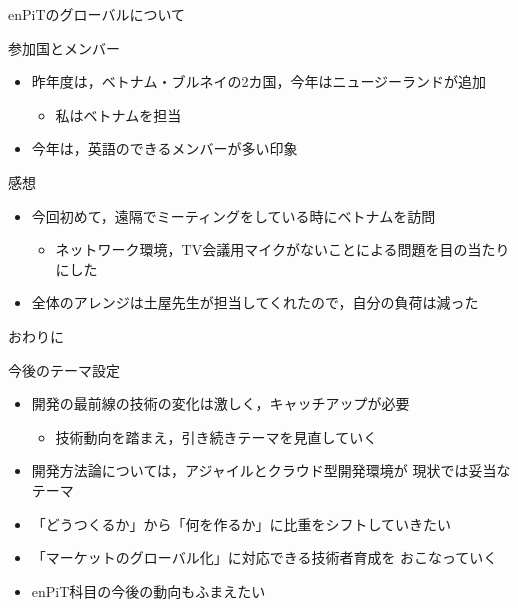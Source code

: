 \documentclass[t]{beamer}
\begin{document}
\begin{frame}[label=sec-9]{enPiTのグローバルについて}
\begin{block}{参加国とメンバー}
\begin{itemize}
\item 昨年度は，ベトナム・ブルネイの2カ国，今年はニュージーランドが追加
\begin{itemize}
\item 私はベトナムを担当
\end{itemize}
\item 今年は，英語のできるメンバーが多い印象
\end{itemize}
\end{block}

\begin{block}{感想}
\begin{itemize}
\item 今回初めて，遠隔でミーティングをしている時にベトナムを訪問
\begin{itemize}
\item ネットワーク環境，TV会議用マイクがないことによる問題を目の当たりにした
\end{itemize}
\item 全体のアレンジは土屋先生が担当してくれたので，自分の負荷は減った
\end{itemize}
\end{block}
\end{frame}
\begin{frame}[label=sec-10]{おわりに}
\begin{block}{今後のテーマ設定}
\begin{itemize}
\item 開発の最前線の技術の変化は激しく，キャッチアップが必要
\begin{itemize}
\item 技術動向を踏まえ，引き続きテーマを見直していく
\end{itemize}
\item 開発方法論については，アジャイルとクラウド型開発環境が
現状では妥当なテーマ
\item 「どうつくるか」から「何を作るか」に比重をシフトしていきたい
\item 「マーケットのグローバル化」に対応できる技術者育成を
おこなっていく
\item enPiT科目の今後の動向もふまえたい
\end{itemize}
\end{block}
\end{frame}
\end{document}
